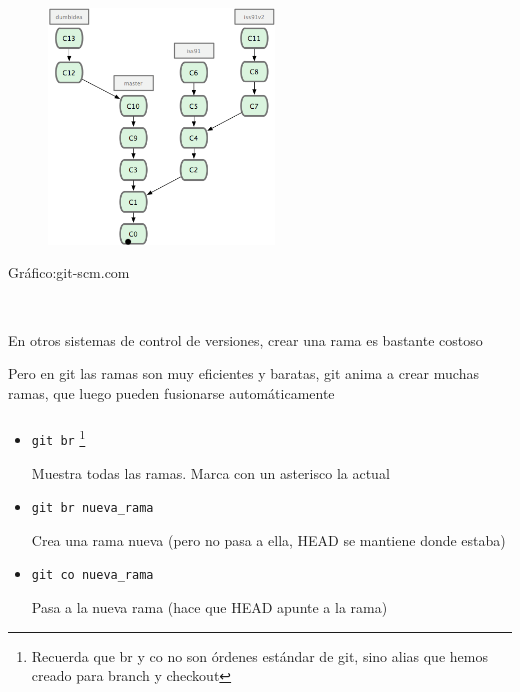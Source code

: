 \documentclass[ucs]{beamer}
\begin{document}
\begin{frame}[fragile]
\begin{minipage}{5cm}
\begin{figure}
\begin{center}
\includegraphics[width=6cm]{figs/rama_compleja}
\end{center}
\end{figure}
\begin{tiny}
\begin{flushright}
Gráfico:git-scm.com
\end{flushright}
\end{tiny}

\end{minipage} \hfill
\

\begin{itemize}
\begin{small}
\item
En otros sistemas de control de versiones, crear una rama
es bastante costoso
\item
Pero en git las ramas son muy eficientes y baratas, git anima
a crear muchas ramas, que luego pueden fusionarse automáticamente

\end{small}
\end{itemize}
\end{frame}



\begin{frame}[fragile]
\frametitle{}
\begin{itemize}
\item
\verb|git br| 
\footnote{Recuerda que br y co no son órdenes estándar de git,
sino alias que hemos creado para branch y checkout}

Muestra todas las ramas. Marca con un asterisco la actual
\item
\verb|git br nueva_rama|

Crea una rama nueva (pero no pasa a ella, HEAD se mantiene donde estaba)

\item
\verb|git co nueva_rama|

Pasa a la nueva rama (hace que HEAD apunte a la rama)


\end{itemize}

\end{frame}
\end{document}
